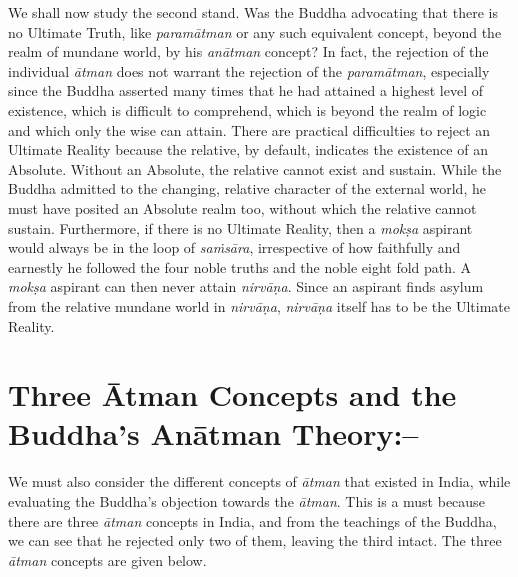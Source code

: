 We shall now study the second stand. Was the Buddha advocating that there is no Ultimate Truth, like \textit{paramātman} or any such equivalent concept, beyond the realm of mundane world, by his \textit{anātman} concept? In fact, the rejection of the individual \textit{ātman} does not warrant the rejection of the \textit{paramātman}, especially since the Buddha asserted many times that he had attained a highest level of existence, which is difficult to comprehend, which is beyond the realm of logic and which only the wise can attain. There are practical difficulties to reject an Ultimate Reality because the relative, by default, indicates the existence of an Absolute. Without an Absolute, the relative cannot exist and sustain. While the Buddha admitted to the changing, relative character of the external world, he must have posited an Absolute realm too, without which the relative cannot sustain. Furthermore, if there is no Ultimate Reality, then a \textit{mokṣa} aspirant would always be in the loop of \textit{saṁsāra}, irrespective of how faithfully and earnestly he followed the four noble truths and the noble eight fold path. A \textit{mokṣa} aspirant can then never attain \textit{nirvāṇa}. Since an aspirant finds asylum from the relative mundane world in \textit{nirvāṇa}, \textit{nirvāṇa} itself has to be the Ultimate Reality.


\section*{Three Ātman Concepts and the Buddha’s Anātman Theory:–}

We must also consider the different concepts of \textit{ātman} that existed in India, while evaluating the Buddha’s objection towards the \textit{ātman}. This is a must because there are three \textit{ātman} concepts in India, and from the teachings of the Buddha, we can see that he rejected only two of them, leaving the third intact. The three \textit{ātman} concepts are given below.

